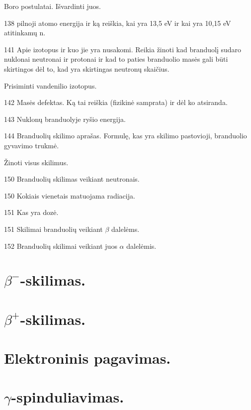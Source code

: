 \begin{remember}
  \item Boro postulatai. Išvardinti juos.
  \item 138 pilnoji atomo energija ir ką reiškia, kai yra 13,5 eV ir
    kai yra 10,15 eV atitinkamų n.
  \item 141 Apie izotopus ir kuo jie yra nusakomi. Reikia žinoti
    kad branduolį sudaro nuklonai neutronai ir protonai ir kad
    to paties branduolio masės gali būti skirtingos dėl to, kad
    yra skirtingas neutronų skaičius.
  \item Prisiminti vandenilio izotopus.
  \item 142 Masės defektas. Ką tai reiškia (fizikinė samprata) ir dėl
    ko atsiranda.
  \item 143 Nuklonų branduolyje ryšio energija.
  \item 144 Branduolių skilimo aprašas. Formulę, kas yra skilimo
    pastovioji, branduolio gyvavimo trukmė.
  \item Žinoti visus skilimus.
  \item 150 Branduolių skilimas veikiant neutronais.
  \item 150 Kokiais vienetais matuojama radiacija.
  \item 151 Kas yra dozė.
  \item 151 Skilimai branduolių veikiant $\beta$ dalelėms.
  \item 152 Branduolių skilimai veikiant juos $\alpha$ dalelėmis.
\end{remember}

\section{$\beta^{-}$-skilimas.}
\section{$\beta^{+}$-skilimas.}
\section{Elektroninis pagavimas.}
\section{$\gamma$-spinduliavimas.}
